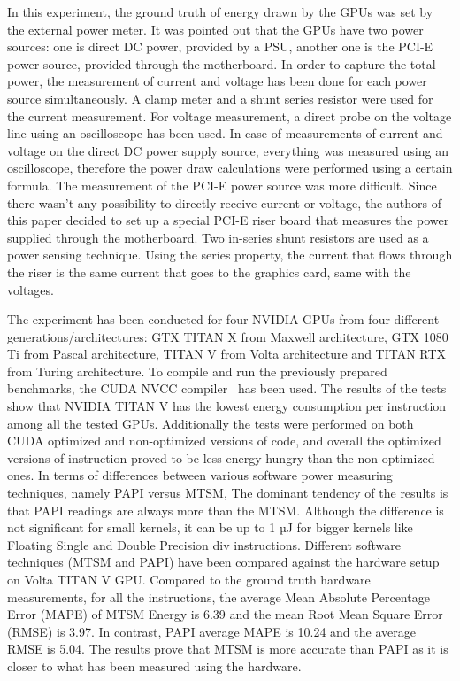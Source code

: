 In this experiment, the ground truth of energy drawn by the GPUs
was set by the external power meter. It was pointed out that the
GPUs have two power sources: one is direct DC power, provided by
a PSU, another one is the PCI-E power source, provided through
the motherboard. In order to capture the total power, the
measurement of current and voltage has been done for each power
source simultaneously. A clamp meter and a shunt series resistor
were used for the current measurement. For voltage measurement,
a direct probe on the voltage line using an oscilloscope has been
used. In case of measurements of current and voltage on the direct
DC power supply source, everything was measured using an
oscilloscope, therefore the power draw calculations were performed
using a certain formula. The measurement of the PCI-E power source
was more difficult. Since there wasn't any possibility to directly
receive current or voltage, the authors of this paper decided to
set up a special PCI-E riser board that measures the power supplied
through the motherboard. Two in-series shunt resistors are used as
a power sensing technique. Using the series property, the current
that flows through the riser is the same current that goes to the
graphics card, same with the voltages.

The experiment has been conducted for four NVIDIA GPUs from four
different generations/architectures: GTX TITAN X from Maxwell
architecture, GTX 1080 Ti from Pascal architecture, TITAN V from
Volta architecture and TITAN RTX from Turing architecture. To
compile and run the previously prepared benchmarks, the CUDA NVCC
compiler~\cite{NVIDIA_NVCC} has been used. The results of the
tests show that NVIDIA TITAN V has the lowest energy consumption
per instruction among all the tested GPUs. Additionally the tests
were performed on both CUDA optimized and non-optimized versions
of code, and overall the optimized versions of instruction proved
to be less energy hungry than the non-optimized ones. In terms of
differences between various software power measuring techniques,
namely PAPI versus MTSM, The dominant tendency of the results is
that PAPI readings are always more than the MTSM. Although the
difference is not significant for small kernels, it can be up to
1 µJ for bigger kernels like Floating Single and Double Precision
div instructions. Different software techniques (MTSM and PAPI)
have been compared against the hardware setup on Volta TITAN V GPU.
Compared to the ground truth hardware measurements, for all the
instructions, the average Mean Absolute Percentage Error (MAPE)
of MTSM Energy is 6.39 and the mean Root Mean Square Error (RMSE)
is 3.97. In contrast, PAPI average MAPE is 10.24 and the average
RMSE is 5.04. The results prove that MTSM is more accurate than
PAPI as it is closer to what has been measured using the hardware.

